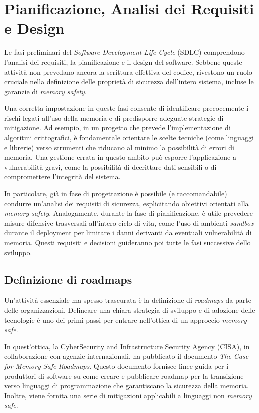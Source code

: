 \section{Pianificazione, Analisi dei Requisiti e Design}
\label{sec:planning_requirements_design}

Le fasi preliminari del \textit{Software Development Life Cycle} (SDLC)
comprendono l'analisi dei requisiti, la pianificazione e il design del software.
Sebbene queste attività non prevedano ancora la scrittura effettiva del codice, rivestono
un ruolo cruciale nella definizione delle proprietà di sicurezza dell'intero sistema,
incluse le garanzie di \textit{memory safety}.

Una corretta impostazione in queste fasi consente di identificare precocemente i
rischi legati all'uso della memoria e di predisporre adeguate strategie di mitigazione.
Ad esempio, in un progetto che prevede l'implementazione di algoritmi crittografici,
è fondamentale orientare le scelte tecniche (come linguaggi e librerie) verso
strumenti che riducano al minimo la possibilità di errori di memoria. Una gestione
errata in questo ambito può esporre l'applicazione a vulnerabilità gravi, come
la possibilità di decrittare dati sensibili o di compromettere l'integrità del
sistema.

In particolare, già in fase di progettazione è possibile (e raccomandabile) condurre
un'analisi dei requisiti di sicurezza, esplicitando obiettivi orientati alla
\textit{memory safety}. Analogamente, durante la fase di pianificazione, è utile
prevedere misure difensive trasversali all'intero ciclo di vita, come l'uso di ambienti
\textit{sandbox} durante il deployment per limitare i danni derivanti da
eventuali vulnerabilità di memoria. Questi requisiti e decisioni guideranno poi tutte
le fasi successive dello sviluppo.

\subsection{Definizione di roadmaps}
\label{sec:roadmap} Un'attività essenziale ma spesso trascurata è la definizione
di \textit{roadmaps} da parte delle organizzazioni. Delineare una chiara strategia
di sviluppo e di adozione delle tecnologie è uno dei primi passi per entrare nell'ottica
di un approccio \textit{memory safe}.

In quest'ottica, la CyberSecurity and Infrastructure Security Agency (CISA), in
collaborazione con agenzie internazionali, ha pubblicato il documento \textit{The
Case for Memory Safe Roadmaps}\cite{memory_safe_roadmaps}. Questo documento
fornisce linee guida per i produttori di software su come creare e pubblicare
roadmap per la transizione verso linguaggi di programmazione che garantiscano la
sicurezza della memoria. Inoltre, viene fornita una serie di mitigazioni
applicabili a linguaggi non \textit{memory safe}.

